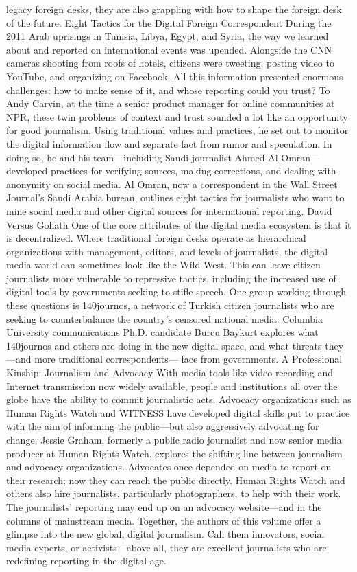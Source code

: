 legacy foreign desks, they are also grappling with how to shape the foreign desk of the
future.
Eight Tactics for the Digital Foreign Correspondent
During the 2011 Arab uprisings in Tunisia, Libya, Egypt, and Syria, the way we learned
about and reported on international events was upended. Alongside the CNN cameras
shooting from roofs of hotels, citizens were tweeting, posting video to YouTube, and
organizing on Facebook. All this information presented enormous challenges: how to
make sense of it, and whose reporting could you trust?
To Andy Carvin, at the time a senior product manager for online communities at NPR,
these twin problems of context and trust sounded a lot like an opportunity for good
journalism. Using traditional values and practices, he set out to monitor the digital
information flow and separate fact from rumor and speculation. In doing so, he and his
team—including Saudi journalist Ahmed Al Omran—developed practices for verifying
sources, making corrections, and dealing with anonymity on social media.
Al Omran, now a correspondent in the Wall Street Journal’s Saudi Arabia bureau,
outlines eight tactics for journalists who want to mine social media and other digital
sources for international reporting.
David Versus Goliath
One of the core attributes of the digital media ecosystem is that it is decentralized. Where
traditional foreign desks operate as hierarchical organizations with management, editors,
and levels of journalists, the digital media world can sometimes look like the Wild West.
This can leave citizen journalists more vulnerable to repressive tactics, including the
increased use of digital tools by governments seeking to stifle speech.
One group working through these questions is 140journos, a network of Turkish citizen
journalists who are seeking to counterbalance the country’s censored national media.
Columbia University communications Ph.D. candidate Burcu Baykurt explores what
140journos and others are doing in the new digital space, and what threats they—and
more traditional correspondents— face from governments.
A Professional Kinship: Journalism and Advocacy
With media tools like video recording and Internet transmission now widely available,
people and institutions all over the globe have the ability to commit journalistic acts.
Advocacy organizations such as Human Rights Watch and WITNESS have developed
digital skills put to practice with the aim of informing the public—but also aggressively
advocating for change.
Jessie Graham, formerly a public radio journalist and now senior media producer at
Human Rights Watch, explores the shifting line between journalism and advocacy
organizations. Advocates once depended on media to report on their research; now they
can reach the public directly. Human Rights Watch and others also hire journalists,
particularly photographers, to help with their work. The journalists’ reporting may end up
on an advocacy website—and in the columns of mainstream media.
Together, the authors of this volume offer a glimpse into the new global, digital
journalism. Call them innovators, social media experts, or activists—above all, they are
excellent journalists who are redefining reporting in the digital age.
